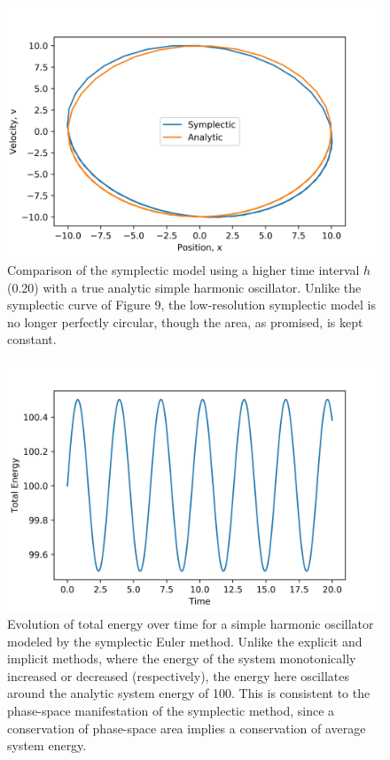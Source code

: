 \documentclass{article}
\begin{document}
\begin{figure}[H]
\includegraphics[width=\textwidth]{phase3.jpg}
\caption{Comparison of the symplectic model using a higher time interval $h$ (0.20) with a true analytic simple harmonic oscillator. Unlike the symplectic curve of Figure 9, the low-resolution symplectic model  is no longer perfectly circular, though the area, as promised, is kept constant.}
\end{figure}

\begin{figure}[H]
\includegraphics[width=\textwidth]{TE3.jpg}
\caption{Evolution of total energy over time for a simple harmonic oscillator modeled by the symplectic Euler method. Unlike the explicit and implicit methods, where the energy of the system monotonically increased or decreased (respectively), the energy here oscillates around the analytic system energy of 100. This is consistent to the phase-space manifestation of the symplectic method, since a conservation of phase-space area implies a conservation of average system energy.}
\end{figure}
\end{document}
